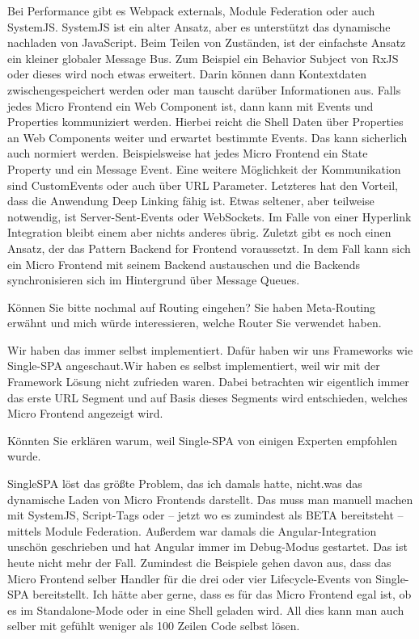 \begin{description}
    \ManfredSteyer Bei Performance gibt es Webpack externals, Module Federation oder auch SystemJS. SystemJS ist ein alter Ansatz, aber es unterstützt das dynamische nachladen von JavaScript. Beim Teilen von Zuständen, ist der einfachste Ansatz ein kleiner globaler Message Bus. Zum Beispiel ein Behavior Subject von RxJS oder dieses wird noch etwas erweitert. Darin können dann Kontextdaten zwischengespeichert werden oder man tauscht darüber Informationen aus. Falls jedes Micro Frontend ein Web Component ist, dann kann mit Events und Properties kommuniziert werden. Hierbei reicht die Shell Daten über Properties an Web Components weiter und erwartet bestimmte Events. Das kann sicherlich auch normiert werden. Beispielsweise hat jedes Micro Frontend ein State Property und ein Message Event. Eine weitere Möglichkeit der Kommunikation sind CustomEvents oder auch über URL Parameter. Letzteres hat den Vorteil, dass die Anwendung Deep Linking fähig ist. Etwas seltener, aber teilweise notwendig, ist Server-Sent-Events oder WebSockets. Im Falle von einer Hyperlink Integration bleibt einem aber nichts anderes übrig. Zuletzt gibt es noch einen Ansatz, der das Pattern Backend for Frontend voraussetzt. In dem Fall kann sich ein Micro Frontend mit seinem Backend austauschen und die Backends synchronisieren sich im Hintergrund über Message Queues.


    \NicoVogel Können Sie bitte nochmal auf Routing eingehen? Sie haben Meta-Routing erwähnt und mich würde interessieren, welche Router Sie verwendet haben.


    \ManfredSteyer Wir haben das immer selbst implementiert. Dafür haben wir uns Frameworks wie Single-SPA angeschaut.Wir haben es selbst implementiert, weil wir mit der Framework Lösung nicht zufrieden waren. Dabei betrachten wir eigentlich immer das erste URL Segment und auf Basis dieses Segments wird entschieden, welches Micro Frontend angezeigt wird.


    \NicoVogel Könnten Sie erklären warum, weil Single-SPA von einigen Experten empfohlen wurde.


    \ManfredSteyer SingleSPA löst das größte Problem, das ich damals hatte, nicht.was das dynamische Laden von Micro Frontends darstellt. Das muss man manuell machen mit SystemJS, Script-Tags oder – jetzt wo es zumindest als BETA bereitsteht – mittels Module Federation. Außerdem war damals die Angular-Integration unschön geschrieben und hat Angular immer im Debug-Modus gestartet. Das ist heute nicht mehr der Fall.
    Zumindest die Beispiele gehen davon aus, dass das Micro Frontend selber Handler für die drei oder vier Lifecycle-Events von Single-SPA bereitstellt. Ich hätte aber gerne, dass es für das Micro Frontend egal ist, ob es im Standalone-Mode oder in eine Shell geladen wird. All dies kann man auch selber mit gefühlt weniger als 100 Zeilen Code selbst lösen.



\end{description}
